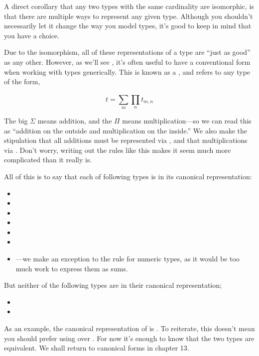 \documentclass[book.tex]{subfiles}
\begin{document}
A direct corollary that any two types with the same cardinality are isomorphic,
is that there are multiple ways to represent any given type. Although you
shouldn't necessarily let it change the way you model types, it's good to keep
in mind that you have a choice.

Due to the isomorphism, all of these representations of a type are ``just as
good'' as any other. However, as we'll see , it's
often useful to have a conventional form when working with types generically.
This  is known as a , and
refers to any type  of the form,

$$
{t = \sum_{m}^{}{\prod_{n}^{}{t_{m,n}}}}
$$

The big $\Sigma$ means addition, and
the $\Pi$ means multiplication---so we can read this as ``addition on the
outside and multiplication on the inside.'' We also make the stipulation that
all additions must be represented via , and that multiplications via
\ty{(,)}. Don't worry, writing out the rules like this makes it seem much more
complicated than it really is.

All of this is to say that each of following types is in its canonical
representation:

\begin{itemize}
  \item{\ty{()}}
  \item{}
  \item{}
  \item{}
  \item{}
  \item{}
  \item{---we make an exception to the rule for numeric
    types, as it would be too much work to express them as sums.}
\end{itemize}

But neither of the following types are in their canonical representation;

\begin{itemize}
  \item{}
  \item{}
\end{itemize}

As an example, the canonical representation of  is .
To reiterate, this doesn't mean you should prefer using  over
. For now it's enough to know that the two types are equivalent. We
shall return to canonical forms in chapter 13.
\end{document}
